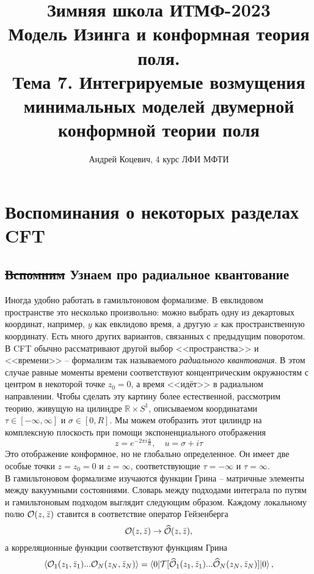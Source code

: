\documentclass[12pt]{article}
\title{Зимняя школа ИТМФ-2023\\
Модель Изинга и конформная теория поля.\\
Тема 7. Интегрируемые возмущения минимальных моделей двумерной конформной теории поля}
\author{Андрей Коцевич, 4 курс ЛФИ МФТИ}
\date{}
\theoremstyle{definition}
\begin{document}
\maketitle
\section{Воспоминания о некоторых разделах CFT}
\subsection{\sout{Вспомним} Узнаем про радиальное квантование}
Иногда удобно работать в гамильтоновом формализме. В евклидовом пространстве это несколько произвольно: можно выбрать одну из декартовых координат, например, $y$ как евклидово время, а другую $x$ как пространственную координату. Есть много других вариантов, связанных с предыдущим поворотом.\\
В CFT обычно рассматривают другой выбор <<пространства>> и <<времени>> -- формализм так называемого \textit{радиального квантования}. В этом случае равные моменты времени соответствуют концентрическим окружностям с центром в некоторой точке $z_0=0$, а время <<идёт>> в радиальном направлении. Чтобы сделать эту картину более естественной, рассмотрим теорию, живущую на цилиндре $\mathbb{R}\times S^1$, описываемом координатами $\tau\in[-\infty,\infty]$ и $\sigma\in[0,R]$. Мы можем отобразить этот цилиндр на комплексную плоскость при помощи экспоненциального отображения
\begin{equation}
    z=e^{-2\pi i\frac{u}{R}},\quad u=\sigma+i\tau
\end{equation}
Это отображение конформное, но не глобально определенное. Он имеет две особые точки $z = z_0=0$ и $z = \infty$, соответствующие $\tau = -\infty$ и $\tau = \infty$.\\
В гамильтоновом формализме изучаются функции Грина -- матричные элементы между вакуумными состояниями. Словарь между подходами интеграла по путям и гамильтоновым подходом выглядит следующим образом. Каждому локальному полю $\mathcal{O}(z,\Bar{z})$ ставится в соответствие оператор Гейзенберга
\begin{equation}
    \mathcal{O}(z,\Bar{z})\rightarrow\widehat{\mathcal{O}}(z,\Bar{z}),
\end{equation}
а корреляционные функции соответствуют функциям Грина
\begin{equation}
    \braket{\mathcal{O}_1(z_1,\Bar{z}_1)...\mathcal{O}_N(z_N,\Bar{z}_N)}=\braket{0|\mathcal{T}[\widehat{\mathcal{O}}_1(z_1,\Bar{z}_1)...\widehat{\mathcal{O}}_N(z_N,\Bar{z}_N)]|0},
\end{equation}
\end{document}
